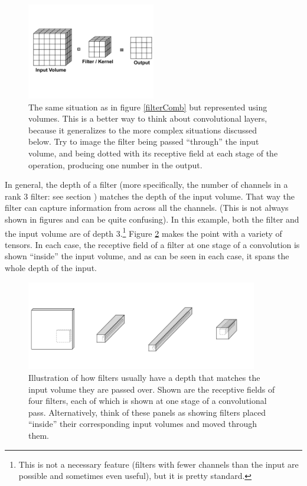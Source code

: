 \begin{figure}
\centering
\includegraphics[width=0.5\textwidth]{images/filterToVolume.png}
\caption[Soraya Boza and Jeff Yoshimi.]{The same situation as in figure \ref{filterComb} but represented using volumes. This is a better way to think about convolutional layers, because it generalizes to the more complex situations discussed below. Try to image the filter being passed ``through'' the input volume, and being dotted with its receptive field at each stage of the operation, producing one number in the output.}
\label{filterToVolume}
\end{figure}

In general, the depth of a filter (more specifically, the number of channels in a rank 3 filter: see section ) matches the depth of the input volume. That way the filter can capture information from across all the channels. (This is not always shown in figures and can be quite confusing).  In this example, both the filter and the input volume are of depth 3.\footnote{This is not a necessary feature (filters with fewer channels than the input are possible and sometimes even useful), but it is pretty standard.} Figure \ref{filterDepth} makes the point with a variety of tensors. In each case, the receptive field of a filter at one stage of a convolution is shown ``inside'' the input volume, and as can be seen in each case, it spans the whole depth of the input. 

\begin{figure}
\centering
\includegraphics[width=0.9\textwidth]{images/filterDepth}
\caption[Soraya Boza.]{Illustration of how filters usually have a depth that matches the input volume they are passed over. Shown are the receptive fields of four filters, each of which is shown at one stage of a convolutional pass. Alternatively, think of these panels as showing filters placed ``inside'' their corresponding input volumes and moved through them.}
\label{filterDepth}
\end{figure}

